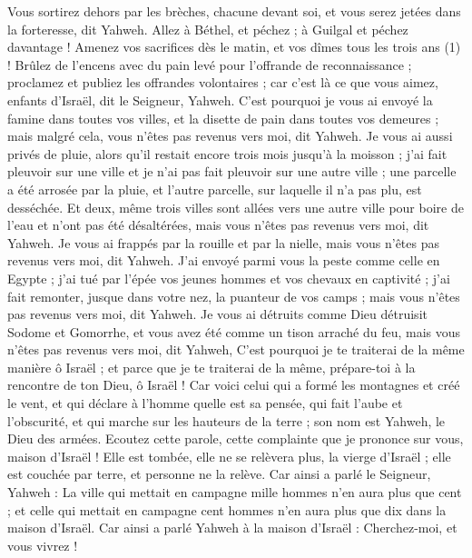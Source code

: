 \begin{multicols}{2}
Vous sortirez dehors par les brèches, chacune devant soi, et vous serez jetées dans la forteresse, dit Yahweh.
Allez à Béthel, et péchez ; à Guilgal et péchez davantage ! Amenez vos sacrifices dès le matin, et vos dîmes tous les trois ans (1) !
Brûlez de l’encens avec du pain levé pour l’offrande de reconnaissance ; proclamez et publiez les offrandes volontaires ; car c’est là ce que vous aimez, enfants d'Israël, dit le Seigneur, Yahweh.
C'est pourquoi je vous ai envoyé la famine dans toutes vos villes, et la disette de pain dans toutes vos demeures ; mais malgré cela, vous n’êtes pas revenus vers moi, dit Yahweh.
Je vous ai aussi privés de pluie, alors qu’il restait encore trois mois jusqu'à la moisson ; j'ai fait pleuvoir sur une ville et je n'ai pas fait pleuvoir sur une autre ville ; une parcelle a été arrosée par la pluie, et l'autre parcelle, sur laquelle il n'a pas plu, est desséchée.
Et deux, même trois villes sont allées vers une autre ville pour boire de l'eau et n'ont pas été désaltérées, mais vous n’êtes pas revenus vers moi, dit Yahweh.
Je vous ai frappés par la rouille et par la nielle, mais vous n’êtes pas revenus vers moi, dit Yahweh.
J’ai envoyé parmi vous la peste comme celle en Egypte ; j'ai tué par l'épée vos jeunes hommes et vos chevaux en captivité ; j'ai fait remonter, jusque dans votre nez, la puanteur de vos camps ; mais vous n’êtes pas revenus vers moi, dit Yahweh.
Je vous ai détruits comme Dieu détruisit Sodome et Gomorrhe, et vous avez été comme un tison arraché du feu, mais vous n’êtes pas revenus vers moi, dit Yahweh,
C'est pourquoi je te traiterai de la même manière ô Israël ; et parce que je te traiterai de la même, prépare-toi à la rencontre de ton Dieu, ô Israël !
Car voici celui qui a formé les montagnes et créé le vent, et qui déclare à l'homme quelle est sa pensée, qui fait l'aube et l'obscurité, et qui marche sur les hauteurs de la terre ; son nom est Yahweh, le Dieu des armées.
\VerseOne{}Ecoutez cette parole, cette complainte que je prononce sur vous, maison d'Israël !
Elle est tombée, elle ne se relèvera plus, la vierge d'Israël ; elle est couchée par terre, et personne ne la relève.
Car ainsi a parlé le Seigneur, Yahweh : La ville qui mettait en campagne mille hommes n'en aura plus que cent ; et celle qui mettait en campagne cent hommes n'en aura plus que dix dans la maison d’Israël.
Car ainsi a parlé Yahweh à la maison d'Israël : Cherchez-moi, et vous vivrez !

\end{multicols}
